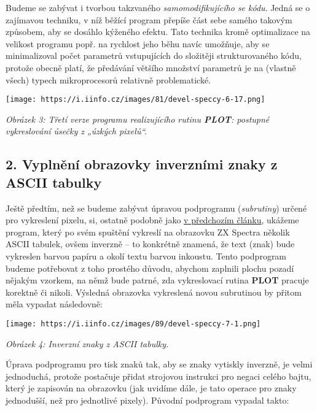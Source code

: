 \documentclass{article}
\renewcommand\includegraphics[2][]{}
\begin{document}
Budeme se zabývat i tvorbou takzvaného \emph{samomodifikujícího se
kódu}. Jedná se o zajímavou techniku, v níž běžící program přepíše část
sebe samého takovým způsobem, aby se dosáhlo kýženého efektu. Tato
technika kromě optimalizace na velikost programu popř. na rychlost jeho
běhu navíc umožňuje, aby se minimalizoval počet parametrů vstupujících
do složitěji strukturovaného kódu, protože obecně platí, že předávání
většího množství parametrů je na (vlastně všech) typech mikroprocesorů
relativně problematické.

\texttt{[image: https://i.iinfo.cz/images/81/devel-speccy-6-17.png]}

\emph{Obrázek 3: Třetí verze programu realizujícího rutinu
\textbf{PLOT}: postupné vykreslování úsečky z „úzkých pixelů``.}

\hypertarget{k02}{%
\subsection{2. Vyplnění obrazovky inverzními znaky z ASCII
tabulky}\label{k02}}

Ještě předtím, než se budeme zabývat úpravou podprogramu
(\emph{subrutiny}) určené pro vykreslení pixelu, si, ostatně podobně
jako
\href{https://www.root.cz/clanky/vyvoj-pro-zx-spectrum-vlastni-vykreslovaci-subrutiny-potreti/}{v
předchozím článku}, ukážeme program, který po svém spuštění vykreslí na
obrazovku ZX Spectra několik ASCII tabulek, ovšem inverzně -- to
konkrétně znamená, že text (znak) bude vykreslen barvou papíru a okolí
textu barvou inkoustu. Tento podprogram budeme potřebovat z toho
prostého důvodu, abychom zaplnili plochu pozadí nějakým vzorkem, na němž
bude patrné, zda vykreslovací rutina \textbf{PLOT} pracuje korektně či
nikoli. Výsledná obrazovka vykreslená novou subrutinou by přitom měla
vypadat následovně:

\texttt{[image: https://i.iinfo.cz/images/89/devel-speccy-7-1.png]}

\emph{Obrázek 4: Inverzní znaky z ASCII tabulky.}

Úprava podprogramu pro tisk znaků tak, aby se znaky vytiskly inverzně,
je velmi jednoduchá, protože postačuje přidat strojovou instrukci pro
negaci celého bajtu, který je zapisován na obrazovku (jak uvidíme dále,
je tato operace pro znaky jednodušší, než pro jednotlivé pixely).
Původní podprogram vypadal takto:
\end{document}
